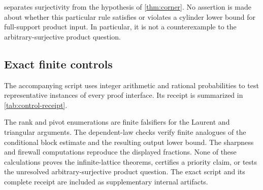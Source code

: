 \begin{remark}\label{rem:surjective-boundary}
 separates surjectivity from the hypothesis of
\cref{thm:corner}.  No assertion is made about whether this particular rule
satisfies or violates a cylinder lower bound for full-support product input.
In particular, it is not a counterexample to the arbitrary-surjective
product question.
\end{remark}

\FloatBarrier
\subsection{Exact finite controls}

The accompanying script uses integer arithmetic and rational probabilities
to test representative instances of every proof interface.  Its receipt is
summarized in \cref{tab:control-receipt}.


\FloatBarrier

The rank and pivot enumerations are finite falsifiers for the Laurent and
triangular arguments.  The dependent-law checks verify finite analogues of
the conditional block estimate and the resulting output lower bound.  The
sharpness and firewall computations reproduce the displayed fractions.
None of these calculations proves the infinite-lattice theorems, certifies a
priority claim, or tests the unresolved arbitrary-surjective product
question.  The exact script and its complete receipt are included as
supplementary internal artifacts.

\FloatBarrier
